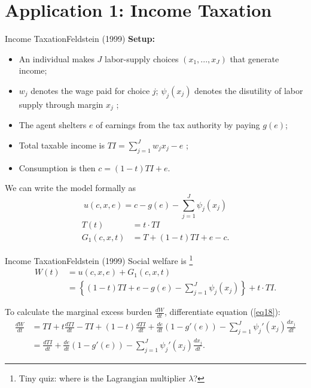 \documentclass{beamer}
\begin{document}
\section{Application 1: Income Taxation}
\begin{frame}[shrink]
	\transfade %
	\tableofcontents[sectionstyle=show/shaded,subsectionstyle=show/shaded/hide]
	\addtocounter{framenumber}{-1}
\end{frame}
\begin{frame}{Income Taxation}{Feldstein (1999)}
	\textbf{Setup:}
	\begin{itemize}
		\item An individual makes $J$ labor-supply choices $(x_1,...,x_J)$ that generate income;
		\item $w_j$ denotes the wage paid for choice $j$; $\psi_j(x_j)$ denotes the disutility of labor supply through margin $x_j$ ;
		\item The agent shelters $e$ of earnings from the tax authority by paying $g(e)$;
		\item Total taxable income is $TI=\sum_{j=1}^Jw_jx_j-e$ ;
		\item Consumption is then $c = (1-t)TI+e$.
	\end{itemize}
	We can write the model formally as
	\begin{equation}\nonumber
		u(c,x,e) = c-g(e)-\sum_{j=1}^J\psi_j(x_j)
	\end{equation}
	\begin{equation}\nonumber
		\begin{aligned}
			T(t) &= t\cdot TI \\
			G_1(c,x,t) &= T + (1-t)TI + e - c.
		\end{aligned}
	\end{equation}
\end{frame}
\begin{frame}{Income Taxation}{Feldstein (1999)}
	Social welfare is \footnote{Tiny quiz: where is the Lagrangian multiplier $\lambda$?}
	\begin{equation}\label{eq18}
		\begin{aligned}
			W(t) &= u(c,x,e) + G_1(c,x,t) \\
			&= \left\{(1-t)TI+e-g(e)-\sum_{j=1}^J\psi_j(x_j)\right\}+t\cdot TI.
		\end{aligned}
	\end{equation}

	To calculate the marginal excess burden $\frac{dW}{dt}$, differentiate equation (\ref{eq18}):
	\begin{equation}\label{eq19}
		\begin{aligned}
			\frac{dW}{dt} &= TI + t\frac{dTI}{dt} - TI + (1-t)\frac{dTI}{dt}+\frac{de}{dt}(1-g'(e))-\sum_{j=1}^J\psi_j'(x_j)\frac{dx_j}{dt} \\
			&= \frac{dTI}{dt} + \frac{de}{dt}(1-g'(e)) - \sum_{j=1}^J\psi_j'(x_j)\frac{dx_j}{dt}.
		\end{aligned}
	\end{equation}
\end{frame}
\end{document}
